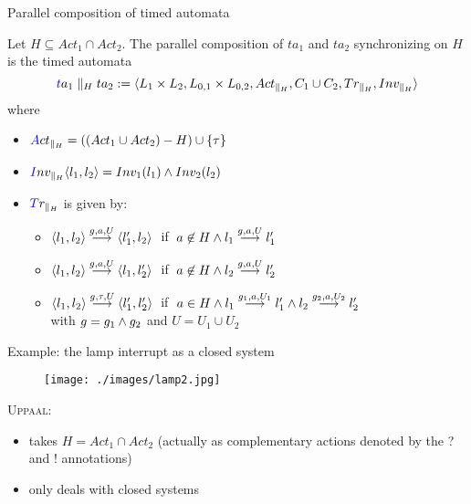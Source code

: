 \documentclass{beamer}
\def\dkb#1{{\blue #1}}
\def\uppaal{\textsc{Uppaal}}
\begin{document}
\begin{slide}{Parallel composition of timed automata}
\small

Let $H \subseteq Act_1 \cap Act_2$. The parallel composition of $ta_1$ and  $ta_2$ synchronizing on $H$
is the timed automata
\begin{equation*}
\dkb{ta_1 \parallel_H ta_2 := \pair{L_1 \times L_2, L_{0,1} \times L_{0,2}, Act_{\parallel_H}, C_1 \cup C_2, Tr_{\parallel_H}, Inv_{\parallel_H}}}
\end{equation*}
where
\begin{itemize}
\item $\dkb{Act_{\parallel_H}} = ((Act_1 \cup Act_2) - H) \cup \enset{\tau}$
\item $\dkb{Inv_{\parallel_H}} \pair{l_1,l_2} = Inv_1(l_1) \e  Inv_2(l_2)$
\item $\dkb{Tr_{\parallel_H}}$ is given by:
\begin{itemize}
\item $\mathopen{\langle}l_1,l_2\mathclose{\rangle} \stackrel{g,a,U}{\longrightarrow} \mathopen{\langle}l'_1,l_2\mathclose{\rangle}\; $ if $\; a \not \in H \mathbin{\wedge}  l_1 \stackrel{g,a,U}{\longrightarrow} l'_1 $
\item $\mathopen{\langle}l_1,l_2\mathclose{\rangle} \stackrel{g,a,U}{\longrightarrow} \mathopen{\langle}l_1,l'_2\mathclose{\rangle}\; $ if $\; a \not \in H \mathbin{\wedge}   l_2 \stackrel{g,a,U}{\longrightarrow} l'_2$
\item $\mathopen{\langle}l_1,l_2\mathclose{\rangle} \stackrel{g,\tau,U}{\longrightarrow} \mathopen{\langle}l'_1,l'_2\mathclose{\rangle}\; $ if $\; a \in H \mathbin{\wedge}  l_1 \stackrel{g_1,a,U_1}{\longrightarrow} l'_1 \mathbin{\wedge} l_2 \stackrel{g_2,a,U_2}{\longrightarrow} l'_2$\\
with $g = g_1 \mathbin{\wedge} g_2$ and $U = U_1 \cup U_2$
\end{itemize}
\end{itemize}
\end{slide}

\begin{slide}{Example: the lamp interrupt as a closed system}
\small

\begin{figure}[htb]
  \centering
  \texttt{[image: ./images/lamp2.jpg]}\\
\end{figure}


\begin{block}{\uppaal:}
\begin{itemize}
\item takes $H = Act_1 \cap Act_2$ (actually as \dkb{complementary} actions denoted by the \dkb{?} and \dkb{!} 
annotations)
\item  only deals with \dkb{closed} systems 
\end{itemize}
\end{block}
\end{slide}
\end{document}
